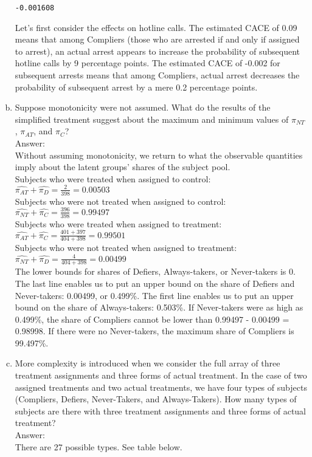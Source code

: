 \documentclass[11pt,notitlepage]{article}\usepackage[]{graphicx}\usepackage[]{color}
\makeatletter
\newenvironment{kframe}{%
 \def\at@end@of@kframe{}%
 \ifinner\ifhmode%
  \def\at@end@of@kframe{\end{minipage}}%
  \begin{minipage}{\columnwidth}%
 \fi\fi%
 \def\FrameCommand##1{\hskip\@totalleftmargin \hskip-\fboxsep
 \colorbox{shadecolor}{##1}\hskip-\fboxsep
     \hskip-\linewidth \hskip-\@totalleftmargin \hskip\columnwidth}%
 \MakeFramed {\advance\hsize-\width
   \@totalleftmargin\z@ \linewidth\hsize
   \@setminipage}}%
 {\par\unskip\endMakeFramed%
 \at@end@of@kframe}
\newenvironment{knitrout}{}{} %
\makeatother
\begin{document}
\begin{enumerate}[a)]
\begin{knitrout}
\begin{kframe}
    \begin{Verbatim}[commandchars=\\\{\}]
-0.001608

    \end{Verbatim}
\end{kframe}
\end{knitrout}

Let's first consider the effects on hotline calls. The estimated CACE of 0.09 means that among Compliers (those who are arrested if and only if assigned to arrest), an actual arrest appears to increase the probability of subsequent hotline calls by 9 percentage points. The estimated CACE of -0.002 for subsequent arrests means that among Compliers, actual arrest decreases the probability of subsequent arrest by a mere 0.2 percentage points. 


\item Suppose monotonicity were not assumed. What do the results of the simplified treatment suggest about the maximum and minimum values of $\pi_{NT}$, $\pi_{AT}$, and $\pi_{C}$? \\
Answer:\\
Without assuming monotonicity, we return to what the observable quantities imply about the latent groups' shares of the subject pool.\\

Subjects who were treated when assigned to control: $\hat{\pi_{AT}} + \hat{\pi_{D}} = \frac{2}{398} = 0.00503$ \\
Subjects who were not treated when assigned to control:  $\hat{\pi_{NT}} + \hat{\pi_{C}} = \frac{396}{398} = 0.99497$\\
Subjects who were treated when assigned to treatment: $\hat{\pi_{AT}} + \hat{\pi_{C}} = \frac{401+397}{404+398} = 0.99501$\\
Subjects who were not treated when assigned to treatment: $\hat{\pi_{NT}} + \hat{\pi_{D}} = \frac{4}{404+398} = 0.00499$\\

The lower bounds for shares of Defiers, Always-takers, or Never-takers is 0. The last line enables us to put an upper bound on the share of Defiers and Never-takers: 0.00499, or 0.499\%. The first line enables us to put an upper bound on the share of Always-takers: 0.503\%. If Never-takers were as high as 0.499\%, the share of Compliers cannot be lower than 0.99497 - 0.00499 = 0.98998. If there were no Never-takers, the maximum share of Compliers is 99.497\%.

\item More complexity is introduced when we consider the full array of three treatment assignments and three forms of actual treatment. In the case of two assigned treatments and two actual treatments, we have four types of subjects (Compliers, Defiers, Never-Takers, and Always-Takers). How many types of subjects are there with three treatment assignments and three forms of actual treatment?\\
Answer:\\
There are 27 possible types. See table below.


\end{enumerate}
\end{document}
